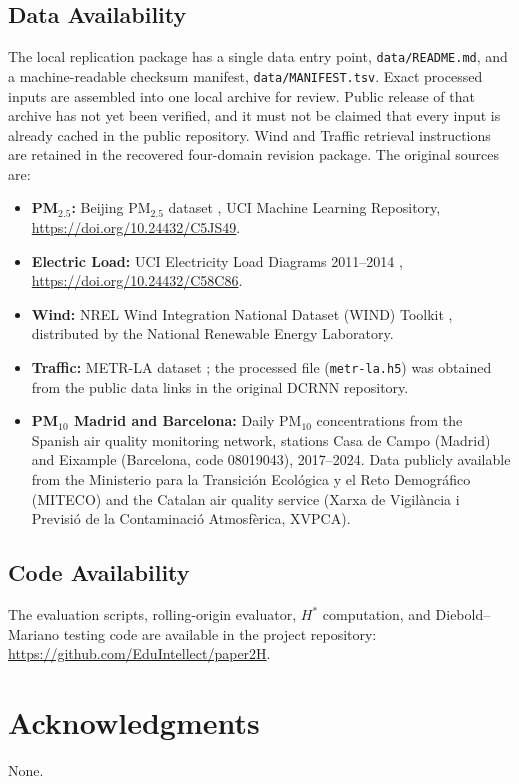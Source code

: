 \documentclass[pdflatex,sn-mathphys]{sn-jnl}
\begin{document}
\subsection*{Data Availability}
The local replication package has a single data entry point,
\texttt{data/README.md}, and a machine-readable checksum manifest,
\texttt{data/MANIFEST.tsv}. Exact processed inputs are assembled into one
local archive for review. Public release of that archive has not yet been
verified, and it must not be claimed that every input is already cached in
the public repository. Wind and Traffic retrieval instructions are retained
in the recovered four-domain revision package. The original sources are:
\begin{itemize}
  \item \textbf{PM$_{2.5}$:} Beijing PM$_{2.5}$ dataset \citep{chen2015beijingpm25}, UCI Machine Learning Repository, \url{https://doi.org/10.24432/C5JS49}.
  \item \textbf{Electric Load:} UCI Electricity Load Diagrams 2011--2014 \citep{trindade2015}, \url{https://doi.org/10.24432/C58C86}.
  \item \textbf{Wind:} NREL Wind Integration National Dataset (WIND) Toolkit \citep{draxl2015}, distributed by the National Renewable Energy Laboratory.
  \item \textbf{Traffic:} METR-LA dataset \citep{li2018dcrnn}; the processed file (\texttt{metr-la.h5}) was obtained from the public data links in the original DCRNN repository.
  \item \textbf{PM$_{10}$ Madrid and Barcelona:} Daily PM$_{10}$ concentrations from the Spanish air quality monitoring network, stations Casa de Campo (Madrid) and Eixample (Barcelona, code 08019043), 2017--2024. Data publicly available from the Ministerio para la Transici\'on Ecol\'ogica y el Reto Demogr\'afico (MITECO) and the Catalan air quality service (Xarxa de Vigil\`ancia i Previsi\'o de la Contaminaci\'o Atmosf\`erica, XVPCA).
\end{itemize}
\subsection*{Code Availability}
The evaluation scripts, rolling-origin evaluator, $H^*$ computation, and Diebold--Mariano testing code are available in the project repository: \url{https://github.com/EduIntellect/paper2H}.

\section*{Acknowledgments}
None.



\end{document}
